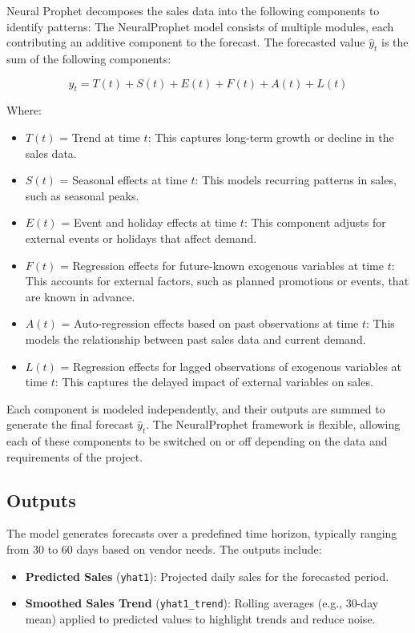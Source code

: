 Neural Prophet decomposes the sales data into the following components to identify patterns:
The NeuralProphet model consists of multiple modules, each contributing an additive component to the forecast. The forecasted value \( \hat{y}_t \) is the sum of the following components:

\begin{equation}
    \hat{y}_t = T(t) + S(t) + E(t) + F(t) + A(t) + L(t)
\end{equation}

Where:
\begin{itemize}
    \item \( T(t) \) = Trend at time \( t \): This captures long-term growth or decline in the sales data.
    \item \( S(t) \) = Seasonal effects at time \( t \): This models recurring patterns in sales, such as seasonal peaks.
    \item \( E(t) \) = Event and holiday effects at time \( t \): This component adjusts for external events or holidays that affect demand.
    \item \( F(t) \) = Regression effects for future-known exogenous variables at time \( t \): This accounts for external factors, such as planned promotions or events, that are known in advance.
    \item \( A(t) \) = Auto-regression effects based on past observations at time \( t \): This models the relationship between past sales data and current demand.
    \item \( L(t) \) = Regression effects for lagged observations of exogenous variables at time \( t \): This captures the delayed impact of external variables on sales.
\end{itemize}

Each component is modeled independently, and their outputs are summed to generate the final forecast \( \hat{y}_t \). The NeuralProphet framework is flexible, allowing each of these components to be switched on or off depending on the data and requirements of the project.

\subsection{Outputs}

The model generates forecasts over a predefined time horizon, typically ranging from 30 to 60 days based on vendor needs. The outputs include:

\begin{itemize}
    \item \textbf{Predicted Sales} (\texttt{yhat1}): Projected daily sales for the forecasted period.
    \item \textbf{Smoothed Sales Trend} (\texttt{yhat1\_trend}): Rolling averages (e.g., 30-day mean) applied to predicted values to highlight trends and reduce noise.
\end{itemize}

